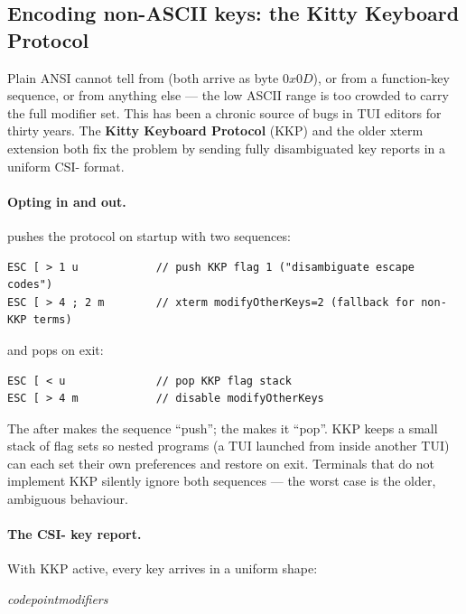 \subsection{Encoding non-ASCII keys: the Kitty Keyboard Protocol}

Plain ANSI cannot tell  from  (both arrive
as byte $0x0D$), or  from a function-key sequence,
or  from anything else --- the low ASCII range is too
crowded to carry the full modifier set. This has been a chronic
source of bugs in TUI editors for thirty years. The \textbf{Kitty
Keyboard Protocol} (KKP) and the older xterm 
extension both fix the problem by sending fully disambiguated key
reports in a uniform CSI- format.

\paragraph{Opting in and out.}
\maya{} pushes the protocol on startup with two sequences:

\begin{lstlisting}
ESC [ > 1 u            // push KKP flag 1 ("disambiguate escape codes")
ESC [ > 4 ; 2 m        // xterm modifyOtherKeys=2 (fallback for non-KKP terms)
\end{lstlisting}

and pops on exit:

\begin{lstlisting}
ESC [ < u              // pop KKP flag stack
ESC [ > 4 m            // disable modifyOtherKeys
\end{lstlisting}

The \code{>} after \code{[} makes the sequence ``push''; the \code{<}
makes it ``pop''. KKP keeps a small stack of flag sets so nested
programs (a TUI launched from inside another TUI) can each set
their own preferences and restore on exit. Terminals that do not
implement KKP silently ignore both sequences --- the worst case is
the older, ambiguous behaviour.

\paragraph{The CSI- key report.}
With KKP active, every key arrives in a uniform shape:

\begin{center}
\small
\code{ESC [ }\emph{codepoint}\code{ ; }\emph{modifiers}
\end{center}

